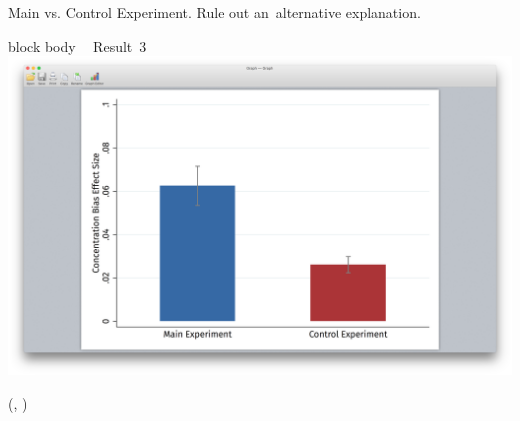 \documentclass{beamer}
\newlength{\blockThree}
\begin{document}
\begin{frame}[t]
\begin{textblock*}{\colwidth}
\begin{alertblock}{
	\begin{minipage}[b]{53pt}
		\RaggedRight
		\noindent\hspace{-7pt}
	\end{minipage}
	\begin{minipage}[b]{\colwidth-145pt}
		Main vs. Control Experiment.\;
		{\mdseries Rule out an~alternative explanation.}
	\end{minipage}
}
\begin{beamercolorbox}[ht=8.0in, center]{block body}
	\Large\textcolor{SpotColor}{\textbf{~} \hspace{0.5in} {\firasemibold\small Result~3}} \\[15pt]
	\includegraphics[width=9.13in, trim={3.75in 1.75in 3.75in 2in}, clip]
		{1_Example_Content/Images/average_main_control.png} \\[59pt]
\end{beamercolorbox}
\end{alertblock}

\end{textblock*}


\TPshowboxesfalse




\begin{textblock*}{\colwidth}(\leftmargin, \blockThree)


\end{textblock*}
\end{frame}
\end{document}

